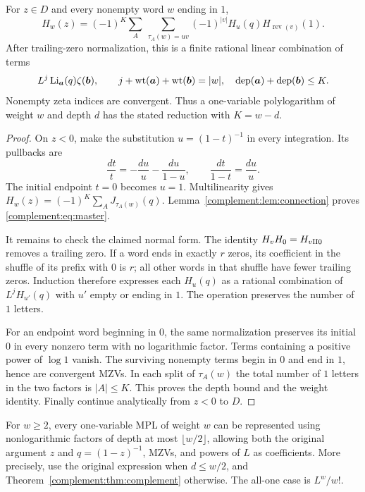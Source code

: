 \begin{theorem}\label{complement:thm:complement}
For $z\in D$ and every nonempty word $w$ ending in $1$,
\begin{equation}\label{complement:eq:master}
 H_w(z)=(-1)^K\sum_A\ \sum_{\tau_A(w)=uv}
 (-1)^{|v|}H_u(q)H_{\operatorname{rev}(v)}(1).
\end{equation}
After trailing-zero normalization, this is a finite rational linear
combination of terms
\begin{equation}\label{complement:eq:termshape}
 L^j\operatorname{Li}_{\boldsymbol a}(q)\zeta(\boldsymbol b),\qquad
 j+\operatorname{wt}(\boldsymbol a)+\operatorname{wt}(\boldsymbol b)=|w|,
 \quad \operatorname{dep}(\boldsymbol a)+\operatorname{dep}(\boldsymbol b)\le K.
\end{equation}
Nonempty zeta indices are convergent. Thus a one-variable polylogarithm
of weight $w$ and depth $d$ has the stated reduction with $K=w-d$.
\end{theorem}
\begin{proof}
On $z<0$, make the substitution $u=(1-t)^{-1}$ in every integration.
Its pullbacks are
\begin{equation}\label{complement:eq:pullbacks}
 \frac{dt}{t}=-\frac{du}{u}-\frac{du}{1-u},\qquad
 \frac{dt}{1-t}=\frac{du}{u}.
\end{equation}
The initial endpoint $t=0$ becomes $u=1$. Multilinearity gives
$H_w(z)=(-1)^K\sum_A J_{\tau_A(w)}(q)$.
Lemma~\ref{complement:lem:connection} proves \eqref{complement:eq:master}.

It remains to check the claimed normal form. The identity
$H_vH_0=H_{v\mathbin{\amalg}0}$ removes a trailing zero. If a word ends in exactly
$r$ zeros, its coefficient in the shuffle of its prefix with $0$ is
$r$; all other words in that shuffle have fewer trailing zeros.
Induction therefore expresses each $H_u(q)$ as a rational combination
of $L^jH_{u'}(q)$ with $u'$ empty or ending in $1$.
The operation preserves the number of $1$ letters.

For an endpoint word beginning in $0$, the same normalization preserves
its initial $0$ in every nonzero term with no logarithmic factor.
Terms containing a positive power of $\log1$ vanish. The surviving
nonempty terms begin in $0$ and end in $1$, hence are convergent MZVs.
In each split of $\tau_A(w)$ the total number of $1$ letters in the
two factors is $|A|\le K$. This proves the depth bound and the weight
identity. Finally continue analytically from $z<0$ to $D$.
\end{proof}

\begin{corollary}\label{complement:cor:halfb}
For $w\ge2$, every one-variable MPL of weight $w$ can be represented
using nonlogarithmic factors of depth at most $\lfloor w/2\rfloor$,
allowing both the original argument $z$ and $q=(1-z)^{-1}$, MZVs, and
powers of $L$ as coefficients. More precisely, use the original
expression when $d\le w/2$, and Theorem~\ref{complement:thm:complement} otherwise.
The all-one case is $L^w/w!$.
\end{corollary}

